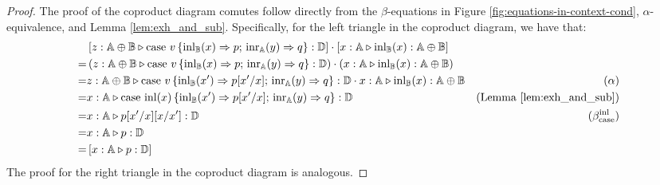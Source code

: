 \documentclass[a4paper,UKenglish,cleveref, autoref, thm-restate]{lipics-v2021}
\begin{document}
\begin{proof}
The proof of the coproduct diagram comutes follow directly from the $\beta$-equations in Figure \ref{fig:equations-in-context-cond}, $\alpha$-equivalence, and Lemma \ref{lem:exh_and_sub}. Specifically, for the left triangle in the coproduct diagram, we have that:
  \begin{align*}
    & \left[z:\mathbb{A} \oplus \mathbb{B}  \triangleright \text{case } v\,\{\mathrm{inl}_{\mathbb{B}}(x) \Rightarrow p ; \, \mathrm{inr}_{\mathbb{A}}(y) \Rightarrow q\}: \mathbb{D}\right] \cdot \left[ x: \mathbb{A}\triangleright \mathrm{inl}_{\mathbb{B}}(x): \mathbb{A} \oplus \mathbb{B} \right]  \\
    =& \left(z:\mathbb{A} \oplus \mathbb{B}  \triangleright \text{case } v\,\{\mathrm{inl}_{\mathbb{B}}(x) \Rightarrow p ; \, \mathrm{inr}_{\mathbb{A}}(y) \Rightarrow q\}: \mathbb{D}\right) \cdot \left( x: \mathbb{A}\triangleright \mathrm{inl}_{\mathbb{B}}(x): \mathbb{A} \oplus \mathbb{B} \right) 
   \\
    =& z:\mathbb{A} \oplus \mathbb{B}  \triangleright \text{case } v\,\{\mathrm{inl}_{\mathbb{B}}(x') \Rightarrow p[x'/ x] ; \, \mathrm{inr}_{\mathbb{A}}(y) \Rightarrow q\}: \mathbb{D} \cdot  x: \mathbb{A}\triangleright \mathrm{inl}_{\mathbb{B}}(x): \mathbb{A} \oplus \mathbb{B} & (\alpha)\\
    = & x:\mathbb{A} \triangleright \text{case } \mathrm{inl}(x) \,\{\mathrm{inl}_{\mathbb{B}}(x') \Rightarrow p[x'/ x] ; \, \mathrm{inr}_{\mathbb{A}}(y) \Rightarrow q\}: \mathbb{D} & (\text{Lemma } \ref{lem:exh_and_sub})  \\
    = &  x:\mathbb{A} \triangleright p[x'/x][x/x']: \mathbb{D} & (\beta_{\text{case}}^{\text{inl}}) \\
    = & x:\mathbb{A} \triangleright p: \mathbb{D} \\
    = &  \left[x:\mathbb{A} \triangleright p: \mathbb{D}\right]  \\
  \end{align*}
  The proof for the right triangle in the coproduct diagram is analogous.
 

\end{proof}
\end{document}
